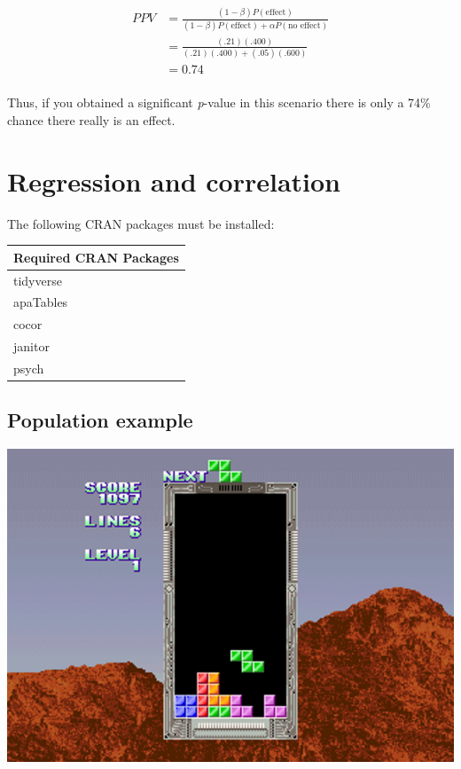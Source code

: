 \documentclass[
]{krantz}
\begin{document}
\[
\begin{aligned}
PPV &= \frac{(1 - \beta)P(\text{effect})}{(1 - \beta)P(\text{effect}) + \alpha P(\text{no effect})}\\
&= \frac{(.21)(.400)}{(.21)(.400) + (.05)(.600)}\\
&= 0.74\\
\end{aligned}
\]

Thus, if you obtained a significant \emph{p}-value in this scenario there is only a 74\% chance there really is an effect.

\hypertarget{regression-and-correlation}{%
\chapter{Regression and correlation}\label{regression-and-correlation}}

The following CRAN packages must be installed:

\begin{longtable}[]{@{}l@{}}
\toprule
Required CRAN Packages \\
\midrule
\endhead
tidyverse \\
apaTables \\
cocor \\
janitor \\
psych \\
\bottomrule
\end{longtable}

\hypertarget{population-example}{%
\section{Population example}\label{population-example}}

\includegraphics[width=8.89in]{ch_correlation/images/tetris}
\end{document}
